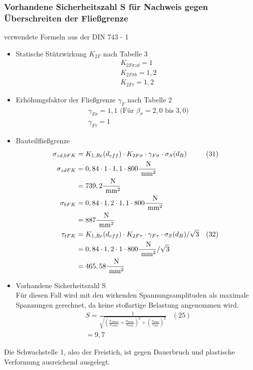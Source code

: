 \subsubsection{Vorhandene Sicherheitszahl S für Nachweis gegen Überschreiten der Fließgrenze}
verwendete Formeln aus der DIN 743 - 1
\begin{itemize}
	\item Statische Stützwirkung $K_{2F}$ nach Tabelle 3
	\begin{align*}
	&K_{2F \sigma zd} = 1 \\
	&K_{2F \sigma b} = 1,2 \\
	&K_{2F \tau} = 1,2 
	\end{align*}
	\item Erhöhungsfaktor der Fließgrenze $\gamma_{F}$ nach Tabelle 2
	\begin{align*}
	&\gamma_{F\sigma} = 1,1 \text{ (Für } \beta_{\sigma} = 2,0 \text{ bis } 3,0 \text{)} \\
	&\gamma_{F\tau} = 1 
	\end{align*}
	\item Bauteilfließgrenze
	\begin{align*}
	\sigma_{zd,bFK} &= K_{1,Re} (d_{eff}) \cdot K_{2F \sigma} \cdot \gamma_{F\sigma} \cdot \sigma_S (d_B) & (31) \\
	\sigma_{zdFK}&= 0,84 \cdot 1 \cdot 1,1 \cdot 800 \frac{\text{ N}}{\text{ mm}^2} \\
	&= 739,2 \frac{\text{ N}}{\text{ mm}^2}\\
	\sigma_{bFK}&= 0,84 \cdot 1,2 \cdot 1,1 \cdot 800 \frac{\text{ N}}{\text{ mm}^2} \\
	&= 887\frac{\text{ N}}{\text{ mm}^2}\\
	\tau_{tFK} &= K_{1,Re} (d_{eff}) \cdot K_{2F \tau} \cdot \gamma_{F\tau} \cdot \sigma_S (d_B) / \sqrt{3} &(32) \\
	&= 0,84 \cdot 1,2 \cdot 1 \cdot 800 \frac{\text{ N}}{\text{ mm}^2} / \sqrt{3}\\
	&= 465,58 \frac{\text{ N}}{\text{ mm}^2}
	\end{align*}
	\item Vorhandene Sicherheitszahl S \\
	Für diesen Fall wird mit den wirkenden Spannungsamplituden als maximale Spannungen gerechnet, da keine stoßartige Belastung angenommen wird. 
	\begin{align*}
	&S = \frac{1}{\sqrt{\left( \frac{\sigma_{zdmax}}{\sigma_{zdFK}}+\frac{\sigma_{bmax}}{\sigma_{bFK}} \right)^2 +\left( \frac{\tau_{tmax}}{\tau_{tFK}} \right)^2 }} & (25)\\
	&= 9,7 
	\end{align*}
\end{itemize}
Die Schwachstelle 1, also der Freistich, ist gegen Dauerbruch und plastische Verformung ausreichend ausgelegt.


